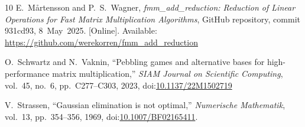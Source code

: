 \documentclass[11pt]{article}
\begin{document}
\begin{thebibliography}{10}
E.~Mårtensson and P.~S.~Wagner, \emph{fmm\_add\_reduction: Reduction of Linear
  Operations for Fast Matrix Multiplication Algorithms}, GitHub repository,
  commit 931cd93, 8~May~2025. [Online]. Available:
  \url{https://github.com/werekorren/fmm_add_reduction}

O.~Schwartz and N.~Vaknin, ``Pebbling games and alternative bases for
high-performance matrix multiplication,'' \emph{SIAM Journal on Scientific
Computing}, vol.~45, no.~6, pp.~C277--C303, 2023,
doi:\href{https://doi.org/10.1137/22M1502719}{10.1137/22M1502719}

V.~Strassen, ``Gaussian elimination is not optimal,''
  \emph{Numerische Mathematik}, vol.~13, pp.~354--356, 1969,
  doi:\href{https://doi.org/10.1007/BF02165411}{10.1007/BF02165411}.

\end{thebibliography}
\end{document}
